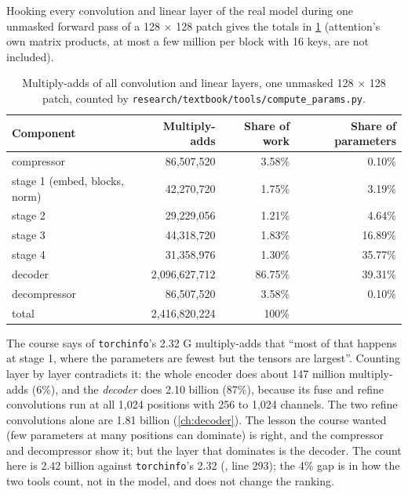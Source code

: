 Hooking every convolution and linear layer of the real model during one unmasked forward pass of a
128 $\times$ 128 patch gives the totals in \cref{tab:params:macs}\tagC{} (attention's own matrix
products, at most a few million per block with 16 keys, are not included).

\begin{table}[htbp]\centering
\caption{Multiply-adds of all convolution and linear layers, one unmasked 128 $\times$ 128 patch,
counted by \texttt{research/textbook/tools/compute\_params.py}.}\label{tab:params:macs}
\begin{tabular}{@{}lrrr@{}}\toprule
Component & Multiply-adds & Share of work & Share of parameters \\\midrule
compressor & 86,507,520 & 3.58\% & 0.10\% \\
stage 1 (embed, blocks, norm) & 42,270,720 & 1.75\% & 3.19\% \\
stage 2 & 29,229,056 & 1.21\% & 4.64\% \\
stage 3 & 44,318,720 & 1.83\% & 16.89\% \\
stage 4 & 31,358,976 & 1.30\% & 35.77\% \\
decoder & 2,096,627,712 & 86.75\% & 39.31\% \\
decompressor & 86,507,520 & 3.58\% & 0.10\% \\\midrule
total & 2,416,820,224 & 100\% & \\\bottomrule
\end{tabular}
\end{table}

\begin{sourcenote}
The course says of \texttt{torchinfo}'s 2.32 G multiply-adds that ``most of that happens at stage 1,
where the parameters are fewest but the tensors are largest''. Counting layer by layer contradicts it:
the whole encoder does about 147 million multiply-adds (6\%), and the \emph{decoder} does 2.10 billion
(87\%), because its fuse and refine convolutions run at all 1,024 positions with 256 to 1,024 channels.
The two refine convolutions alone are 1.81 billion (\cref{ch:decoder}). The lesson the course wanted
(few parameters at many positions can dominate) is right, and the compressor and decompressor show it;
but the layer that dominates is the decoder. The count here is 2.42 billion against \texttt{torchinfo}'s
2.32 (, line 293); the 4\% gap is in
how the two tools count, not in the model, and does not change the ranking.
\end{sourcenote}

